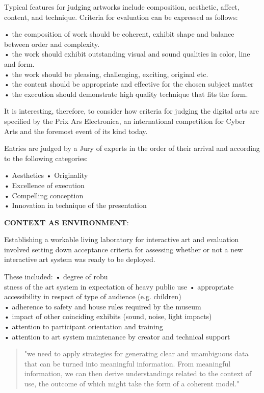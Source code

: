 Typical features for judging artworks include composition, aesthetic, affect, content, and technique. Criteria for evaluation can be expressed as follows:

•	the composition of work should be coherent, exhibit shape and balance between order and complexity.\\
•	the work should exhibit outstanding visual and sound qualities in color, line and form.\\
•	the work should be pleasing, challenging, exciting, original etc.\\
•	the content should be appropriate and effective for the chosen subject matter\\
•	the execution should demonstrate high quality technique that fits the form.

It is interesting, therefore, to consider how criteria for judging the digital arts are specified by the Prix Ars Electronica, an international competition for Cyber Arts and the foremost event of its kind today.

Entries are judged by a Jury of experts in the order of their arrival and according to the following categories:

•	Aesthetics • Originality\\
•	Excellence of execution\\
•	Compelling conception\\
•	Innovation in technique of the presentation

\textbf{CONTEXT AS ENVIRONMENT}: \citep[p.21]{Candy2012}

Establishing a workable living laboratory for interactive art and evaluation involved setting down acceptance criteria for assessing whether or not a new interactive art system was ready to be deployed.

These included:
•	degree of robu\\stness of the art system in expectation of heavy public use
•	appropriate accessibility in respect of type of audience (e.g. children)\\
•	adherence to safety and house rules required by the museum\\
•	impact of other coinciding exhibits (sound, noise, light impacts)\\
•	attention to participant orientation and training\\
•	attention to art system maintenance by creator and technical support

\begin{quote}
  "we need to apply strategies for generating clear and unambiguous data that can be turned into meaningful information. From meaningful information, we can then derive understandings related to the context of use, the outcome of which might take the form of a coherent model." \citep[p.21]{Candy2012}
\end{quote}

